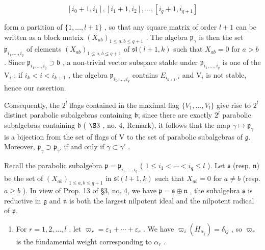 \[
\left[ i _ {0} + 1, i _ {1} \right], \left[ i _ {1} + 1, i _ {2} \right], \dots , \left[ i _ {q} + 1, i _ {q + 1} \right]
\]

form a partition of \(\{1, \ldots, l + 1\}\) , so that any square matrix of order \(l + 1\) can be written as a block matrix \((X_{ab})_{1 \leq a, b \leq q + 1}\) . The algebra \(\mathfrak{p}_{\gamma}\) is then the set \(\mathfrak{p}_{i_1,\dots,i_q}\) of elements \((X_{ab})_{1\leq a,b\leq q + 1}\) of \(\mathfrak{sl}(l + 1,k)\) such that \(X_{ab} = 0\) for \(a > b\) . Since \(\mathfrak{p}_{i_1,\dots,i_q}\supset \mathfrak{b}\) , a non-trivial vector subspace stable under \(\mathfrak{p}_{i_1,\dots,i_q}\) is one of the \(\mathrm{V}_i\) ; if \(i_k < i < i_{k + 1}\) , the algebra \(\mathfrak{p}_{i_1,\dots,i_q}\) contains \(E_{i_{k + 1},i}\) and \(\mathrm{V}_i\) is not stable, hence our assertion.

Consequently, the \(2^{l}\) flags contained in the maximal flag \(\{V_{1},\ldots,V_{l}\}\) give rise to \(2^{l}\) distinct parabolic subalgebras containing \(\mathfrak{b}\); since there are exactly \(2^{l}\) parabolic subalgebras containing \(\mathfrak{b}\) ( \(\S3\) , no. 4, Remark), it follows that the map \(\gamma\mapsto \mathfrak{p}_{\gamma}\) is a bijection from the set of flags of V to the set of parabolic subalgebras of \(\mathfrak{g}\). Moreover, \(\mathfrak{p}_{\gamma}\supset \mathfrak{p}_{\gamma'}\) if and only if \(\gamma\subset\gamma'\) .

Recall the parabolic subalgebra \(\mathfrak{p} = \mathfrak{p}_{i_1, \ldots, i_q}\) ( \(1 \leq i_1 < \cdots < i_q \leq l\) ). Let \(\mathfrak{s}\) (resp. \(\mathfrak{n}\)) be the set of \((X_{ab})_{1 \leq a, b \leq q+1}\) in \(\mathfrak{sl}(l+1, k)\) such that \(X_{ab} = 0\) for \(a \neq b\) (resp. \(a \geq b\) ). In view of Prop. 13 of §3, no. 4, we have \(\mathfrak{p} = \mathfrak{s} \oplus \mathfrak{n}\) , the subalgebra \(\mathfrak{s}\) is reductive in \(\mathfrak{g}\) and \(\mathfrak{n}\) is both the largest nilpotent ideal and the nilpotent radical of \(\mathfrak{p}\).

\begin{enumerate}
\def\labelenumi{(\Roman{enumi})}
\setcounter{enumi}{3}
\tightlist
\item
  For \(r = 1, 2, \ldots, l\) , let \(\varpi_{r} = \varepsilon_{1} + \cdots + \varepsilon_{r}\) . We have \(\varpi_{i}(H_{\alpha_{j}}) = \delta_{ij}\) , so \(\varpi_{r}\) is the fundamental weight corresponding to \(\alpha_{r}\) .
\end{enumerate}

